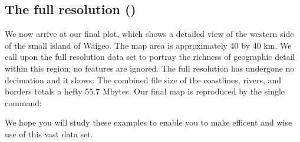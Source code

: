
\subsection{The full resolution ()} 

We now arrive at our final plot, which shows a detailed view of
the western side of the small island of Waigeo.  The map area
is approximately 40 by 40 km.  We call upon the full resolution
data set to portray the richness of geographic detail within this
region; no features are ignored.  The full resolution has
undergone no decimation and it shows: The combined file size of
the coastlines, rivers, and borders totals a hefty 55.7 Mbytes.
Our final map is reproduced by the single command:



We hope you will study these examples to enable you to make
efficent and wise use of this vast data set.
